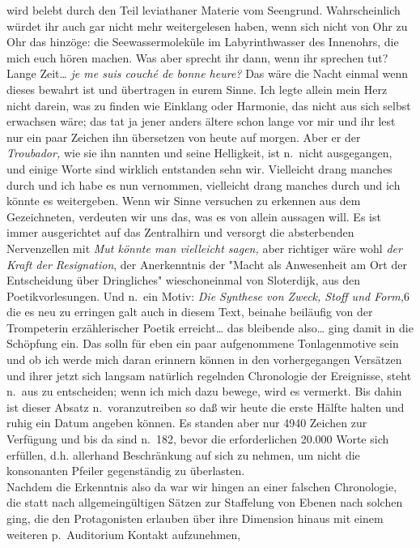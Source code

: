 \documentclass[
]{article}
\begin{document}
wird belebt durch den Teil leviathaner Materie vom Seengrund.
Wahrscheinlich würdet ihr auch gar nicht mehr weitergelesen haben, wenn
sich nicht von Ohr zu Ohr das hinzöge: die Seewassermoleküle im
Labyrinthwasser des Innenohrs, die mich euch hören machen. Was aber
sprecht ihr dann, wenn ihr sprechen tut? Lange Zeit\ldots{} \emph{je me
suis couché de bonne heure?} Das wäre die Nacht einmal wenn dieses
bewahrt ist und übertragen in eurem Sinne. Ich legte allein mein Herz
nicht darein, was zu finden wie Einklang oder Harmonie, das nicht aus
sich selbst erwachsen wäre; das tat ja jener anders ältere schon lange
vor mir und ihr lest nur ein paar Zeichen ihn übersetzen von heute auf
morgen. Aber er der \emph{Troubador, }wie sie ihn nannten und seine
Helligkeit, ist n.~nicht ausgegangen, und einige Worte sind wirklich
entstanden sehn wir. Vielleicht drang manches durch und ich habe es nun
vernommen, vielleicht drang manches durch und ich könnte es weitergeben.
Wenn wir Sinne versuchen zu erkennen aus dem Gezeichneten, verdeuten wir
uns das, was es von allein aussagen will. Es ist immer ausgerichtet auf
das Zentralhirn und versorgt die absterbenden Nervenzellen mit \emph{Mut
könnte man vielleicht sagen,} aber richtiger wäre wohl \emph{der Kraft
der Resignation}, der Anerkenntnis der "Macht als Anwesenheit am Ort der
Entscheidung über Dringliches" wieschoneinmal von Sloterdijk, aus den
Poetikvorlesungen. Und n.~ein Motiv: \emph{Die Synthese von Zweck, Stoff
und Form,}6 die es neu zu erringen galt auch in diesem Text, beinahe
beiläufig von der Trompeterin erzählerischer Poetik erreicht\ldots{} das
bleibende also\ldots{} ging damit in die Schöpfung ein. Das solln für
eben ein paar aufgenommene Tonlagenmotive sein und ob ich werde mich
daran erinnern können in den vorhergegangen Versätzen und ihrer jetzt
sich langsam natürlich regelnden Chronologie der Ereignisse, steht
n.~aus zu entscheiden; wenn ich mich dazu bewege, wird es vermerkt. Bis
dahin ist dieser Absatz n.~voranzutreiben so daß wir heute die erste
Hälfte halten und ruhig ein Datum angeben können. Es standen aber nur
4940 Zeichen zur Verfügung und bis da sind n.~182, bevor die
erforderlichen 20.000 Worte sich erfüllen, d.h. allerhand Beschränkung
auf sich zu nehmen, um nicht die konsonanten Pfeiler gegenständig zu
überlasten.\\
Nachdem die Erkenntnis also da war wir hingen an einer falschen
Chronologie, die statt nach allgemeingültigen Sätzen zur Staffelung von
Ebenen nach solchen ging, die den Protagonisten erlauben über ihre
Dimension hinaus mit einem weiteren p.~Auditorium Kontakt aufzunehmen,
\end{document}
